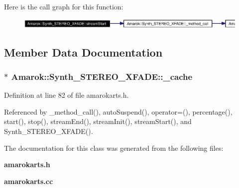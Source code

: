 Here is the call graph for this function:\begin{figure}[H]
\begin{center}
\leavevmode
\includegraphics[width=398pt]{classAmarok_1_1Synth__STEREO__XFADE_Amarok_1_1Synth__STEREO__XFADEa13_cgraph}
\end{center}
\end{figure}


\subsection{Member Data Documentation}
\subsubsection{$\ast$ {\bf Amarok::Synth\_\-STEREO\_\-XFADE::\_\-cache}\hspace{0.3cm}{\tt  [private]}}\label{classAmarok_1_1Synth__STEREO__XFADE_Amarok_1_1Synth__STEREO__XFADEr0}




Definition at line 82 of file amarokarts.h.

Referenced by \_\-method\_\-call(), auto\-Suspend(), operator=(), percentage(), start(), stop(), stream\-End(), stream\-Init(), stream\-Start(), and Synth\_\-STEREO\_\-XFADE().

The documentation for this class was generated from the following files:\begin{CompactItemize}
\item 
{\bf amarokarts.h}\item 
{\bf amarokarts.cc}\end{CompactItemize}
